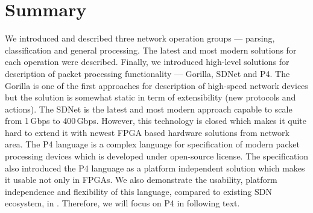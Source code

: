 \section{Summary}
%
We introduced and described three network operation groups --- parsing, classification and general processing. 
The latest and most modern solutions for each operation were described. 
Finally, we introduced high-level solutions for description of packet processing functionality --- Gorilla, SDNet and P4.
The Gorilla is one of the first approaches for description of high-speed network devices but the solution is somewhat static in term
of extensibility (new protocols and actions). 
The SDNet is the latest and most modern approach capable to scale from 1\,Gbps to 400\,Gbps. However, this technology is 
closed which makes it quite hard to extend it with newest FPGA based hardware solutions from network area. 
The P4 language is a complex language for specification of modern packet processing devices which is developed under open-source license. 
The specification also introduced the P4 language as a platform independent solution which makes it usable not only in FPGAs. 
We also demonstrate the usability, platform independence and flexibility of this language, compared to existing SDN ecosystem, in 
\cite{2016cesnet-p4,2016root-p4}. Therefore, we will focus on P4 in following text.
